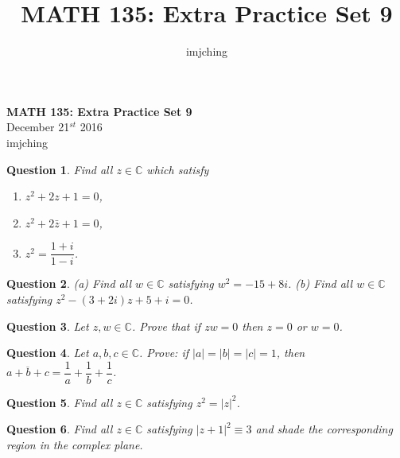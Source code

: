 \documentclass[11pt,oneside]{article}
\title{MATH 135: Extra Practice Set 9}
\author{imjching}
\newtheorem{question}{Question}
\begin{document}
\begin{center}
    \textbf{MATH 135: Extra Practice Set 9} \\
    December 21$^{st}$ 2016 \\

    imjching
\end{center}

\bigskip


\begin{question}
	Find all $z \in \mathbb{C}$ which satisfy
	\begin{enumerate}
		\item[(a)] $z^2 + 2z + 1 = 0$,
		\item[(b)] $z^2 + 2\bar{z} + 1 = 0$,
		\item[(c)] $z^2 = \dfrac{1 + i}{1 - i}$.
	\end{enumerate}
\end{question}

\bigskip

\begin{question}
	(a) Find all $w \in \mathbb{C}$ satisfying $w^2 = -15 + 8i$. (b) Find all $w \in \mathbb{C}$ satisfying $z^2 - (3 + 2i)z + 5 + i = 0$.
\end{question}

\bigskip

\begin{question}
	Let $z, w \in \mathbb{C}$. Prove that if $zw = 0$ then $z = 0$ or $w = 0$.	
\end{question}

\bigskip

\begin{question}
	Let $a, b, c \in \mathbb{C}$. Prove: if $|a| = |b| = |c| = 1$, then $\overline{a + b + c} = \dfrac{1}{a} + \dfrac{1}{b} + \dfrac{1}{c}$.
\end{question}

\bigskip

\begin{question}
	Find all $z \in \mathbb{C}$ satisfying $z^2 = |z|^2$.
\end{question}

\bigskip

\begin{question}
		Find all $z \in \mathbb{C}$ satisfying $|z + 1|^2 \equiv 3$ and shade the corresponding region in the complex plane.
\end{question}
\end{document}
